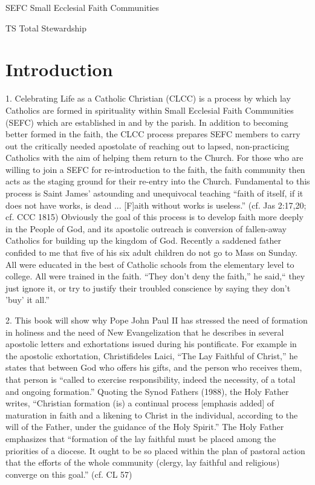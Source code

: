 \documentclass[oneside]{book}
\begin{document}
SEFC        Small Ecclesial Faith Communities

TS        Total Stewardship


\chapter{Introduction}

1. Celebrating Life as a Catholic Christian (CLCC) is a process by which lay
Catholics are formed in spirituality within Small Ecclesial Faith Communities
(SEFC) which are established in and by the parish. In addition to becoming
better formed in the faith, the CLCC process prepares SEFC members to carry out
the critically needed apostolate of reaching out to lapsed, non-practicing
Catholics with the aim of helping them return to the Church. For those who are
willing to join a SEFC for re-introduction to the faith, the faith community
then acts as the staging ground for their re-entry into the Church. Fundamental
to this process is Saint James' astounding and unequivocal teaching ``faith of
itself, if it does not have works, is dead ... [F]aith without works is
useless.'' (cf. Jas 2:17,20; cf. CCC 1815) Obviously the goal of this process is
to develop faith more deeply in the People of God, and its apostolic outreach is
conversion of fallen-away Catholics for building up the kingdom of God.
Recently a saddened father confided to me that five of his six adult children do
not go to Mass on Sunday. All were educated in the best of Catholic schools from
the elementary level to college. All were trained in the faith. ``They don't
deny the faith,'' he said,`` they just ignore it, or try to justify their
troubled conscience by saying they don't 'buy' it all.''

2. This book will show why Pope John Paul II has stressed the need of formation
in holiness and the need of New Evangelization that he describes in several
apostolic letters and exhortations issued during his pontificate. For example in
the apostolic exhortation, Christifideles Laici, ``The Lay Faithful of Christ,''
he states that between God who offers his gifts, and the person who receives
them, that person is ``called to exercise responsibility, indeed the necessity,
of a total and ongoing formation.'' Quoting the Synod Fathers (1988), the Holy
Father writes, ``Christian formation (is) a continual process [emphasis added]
of maturation in faith and a likening to Christ in the individual, according to
the will of the Father, under the guidance of the Holy Spirit.'' The Holy Father
emphasizes that ``formation of the lay faithful must be placed among the
priorities of a diocese. It ought to be so placed within the plan of pastoral
action that the efforts of the whole community (clergy, lay faithful and
religious) converge on this goal.'' (cf. CL 57)
\end{document}
